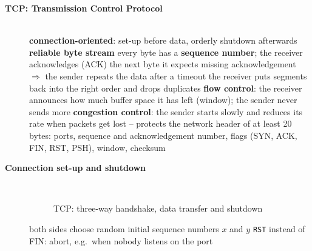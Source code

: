 \begin{description}
\item[{\rot\bf TCP: Transmission Control Protocol}]~\\[-\lblskip]
\bi
	\ite \textbf{connection-oriented}: set-up before data, orderly shutdown afterwards
	\ite \textbf{reliable byte stream}
	\bi
		\ite every byte has a \textbf{sequence number}; the receiver acknowledges (ACK) the next byte it expects
		\ite missing acknowledgement $\Rightarrow$ the sender repeats the data after a timeout
		\ite the receiver puts segments back into the right order and drops duplicates
	\ei
	\ite \textbf{flow control}: the receiver announces how much buffer space it has left (window); the sender never sends more
	\ite \textbf{congestion control}: the sender starts slowly and reduces its rate when packets get lost -- protects the network
	\ite header of at least 20 bytes: ports, sequence and acknowledgement number, flags (SYN, ACK, FIN, RST, PSH), window, checksum
\ei
\os{\newpage}

\item[{\rot\bf Connection set-up and shutdown}]~\\[-\lblskip]
\begin{figure}[!hbtp]
\begin{center}
\caption{TCP: three-way handshake, data transfer and shutdown}
\end{center}
\end{figure}
\bi
	\ite both sides choose random initial sequence numbers $x$ and $y$
	\ite \texttt{RST} instead of FIN: abort, e.g.\ when nobody listens on the port
\ei
\os{\newpage}


\end{description}
